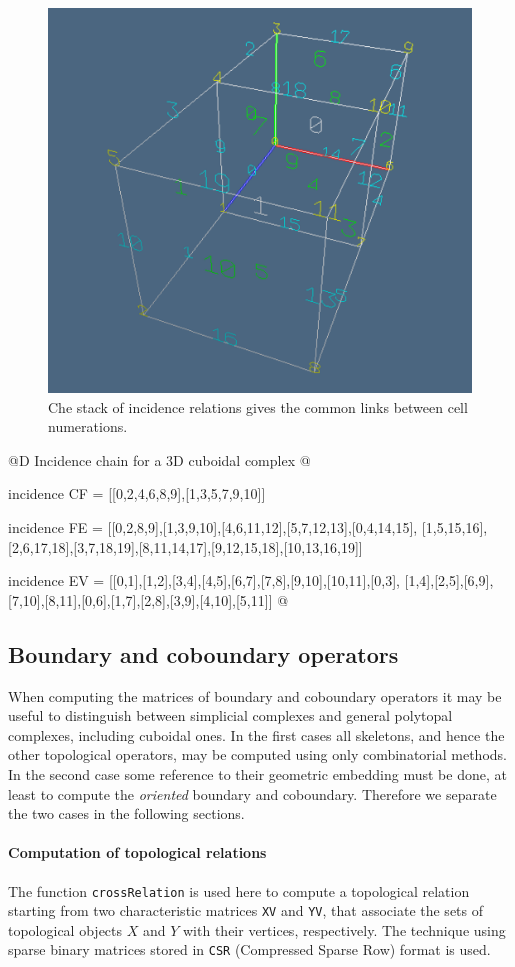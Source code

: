 \documentclass[11pt,oneside]{article}    %
\begin{document}
\begin{figure}[htbp] %
   \centering
   \includegraphics[width=0.5\linewidth]{images/incidenceChain} 
   \caption{Che stack of incidence relations gives the common links between cell numerations.}
   \label{incidenceChain}
\end{figure}


@D Incidence chain for a 3D cuboidal complex
@{incidence CF = [[0,2,4,6,8,9],[1,3,5,7,9,10]]

incidence FE = [[0,2,8,9],[1,3,9,10],[4,6,11,12],[5,7,12,13],[0,4,14,15],
[1,5,15,16],[2,6,17,18],[3,7,18,19],[8,11,14,17],[9,12,15,18],[10,13,16,19]]

incidence EV = [[0,1],[1,2],[3,4],[4,5],[6,7],[7,8],[9,10],[10,11],[0,3],
[1,4],[2,5],[6,9],[7,10],[8,11],[0,6],[1,7],[2,8],[3,9],[4,10],[5,11]]
@}



\subsection{Boundary and coboundary operators}

When computing the matrices of boundary and coboundary operators it may be useful to distinguish between simplicial complexes and general polytopal complexes, including  cuboidal ones. In the first cases all skeletons, and hence the other topological operators, may be computed using only combinatorial methods. In the second case some reference to their geometric embedding must be done, at least to compute the \emph{oriented} boundary and coboundary. Therefore we separate the two cases in the following sections.


\paragraph{Computation of topological relations} 
The function \texttt{crossRelation} is used here to compute a topological relation starting from two characteristic matrices \texttt{XV} and \texttt{YV}, that associate the sets of topological objects $X$ and $Y$ with their vertices, respectively.
The technique using sparse binary matrices stored in \texttt{CSR} (Compressed Sparse Row) format is used.
\end{document}
